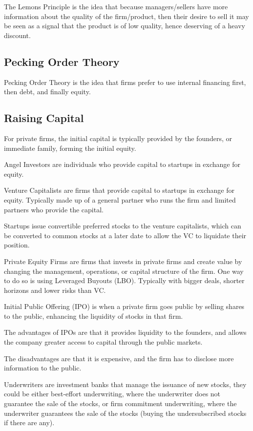 The Lemons Principle is the idea that because managers/sellers have more information about
the quality of the firm/product, then their desire to sell it may be seen
as a signal that the product is of low quality, hence deserving of a heavy discount.

\subsection{Pecking Order Theory}
Pecking Order Theory is the idea that firms prefer to use internal financing first, 
then debt, and finally equity.

\subsection{Raising Capital}
For private firms, the initial capital is typically provided by the founders, 
or immediate family, forming the initial equity.

Angel Investors are individuals who provide capital to startups in exchange for 
equity.

Venture Capitalists are firms that provide capital to startups in 
exchange for equity. Typically made up of a general partner who runs the firm and limited 
partners who provide the capital.

Startups issue convertible preferred stocks to the venture capitalists, 
which can be converted to common stocks at a later date to allow the VC to liquidate their position.

Private Equity Firms are firms that invests in private firms and create value
by changing the management, operations, or capital structure of the firm. One way to do so is using Leveraged Buyouts (LBO).
Typically with bigger deals, shorter horizons and lower risks than VC.

Initial Public Offering (IPO) is when a private firm goes public by selling shares 
to the public, enhancing the liquidity of stocks in that firm.

The advantages of IPOs are that it provides liquidity to the founders, and allows the company
greater access to capital through the public markets.

The disadvantages are that it is expensive, and the firm has to disclose more 
information to the public.

Underwriters are investment banks that manage the issuance of new stocks,
they could be either best-effort underwriting, where the underwriter does not 
guarantee the sale of the stocks, or firm commitment underwriting, 
where the underwriter guarantees the sale of the stocks (buying the undersubscribed stocks if there are any).

